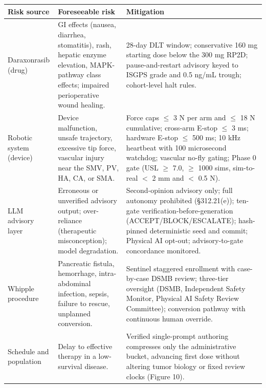 \noindent\begin{tabularx}{\textwidth}{L{2.8cm} L{5.4cm} Y}
\toprule
\textbf{Risk source} & \textbf{Foreseeable risk} & \textbf{Mitigation} \\
\midrule
Daraxonrasib (drug) & GI effects (nausea, diarrhea, stomatitis), rash, hepatic enzyme elevation, MAPK-pathway class effects; impaired perioperative wound healing. & 28-day DLT window; conservative 160 mg starting dose below the 300 mg RP2D; pause-and-restart advisory keyed to ISGPS grade and 0.5 ng/mL trough; cohort-level halt rules. \\
\addlinespace
Robotic system (device) & Device malfunction, unsafe trajectory, excessive tip force, vascular injury near the SMV, PV, HA, CA, or SMA. & Force caps $\leq$ 3 N per arm and $\leq$ 18 N cumulative; cross-arm E-stop $\leq$ 3 ms; hardware E-stop $\leq$ 500 ms; 10 kHz heartbeat with 100 microsecond watchdog; vascular no-fly gating; Phase 0 gate (USL $\geq$ 7.0, $\geq$ 1000 sims, sim-to-real $<$ 2 mm and $<$ 0.5 N). \\
\addlinespace
LLM advisory layer & Erroneous or unverified advisory output; over-reliance (therapeutic misconception); model degradation. & Second-opinion advisory only; full autonomy prohibited (\S 312.21(e)); ten-gate verification-before-generation (ACCEPT/BLOCK/ESCALATE); hash-pinned deterministic seed and commit; Physical AI opt-out; advisory-to-gate concordance monitored. \\
\addlinespace
Whipple procedure & Pancreatic fistula, hemorrhage, intra-abdominal infection, sepsis, failure to rescue, unplanned conversion. & Sentinel staggered enrollment with case-by-case DSMB review; three-tier oversight (DSMB, Independent Safety Monitor, Physical AI Safety Review Committee); conversion pathway with continuous human override. \\
\addlinespace
Schedule and population & Delay to effective therapy in a low-survival disease. & Verified single-prompt authoring compresses only the administrative bucket, advancing first dose without altering tumor biology or fixed review clocks (Figure 10). \\
\bottomrule
\end{tabularx}
\vspace*{-0.315cm}

